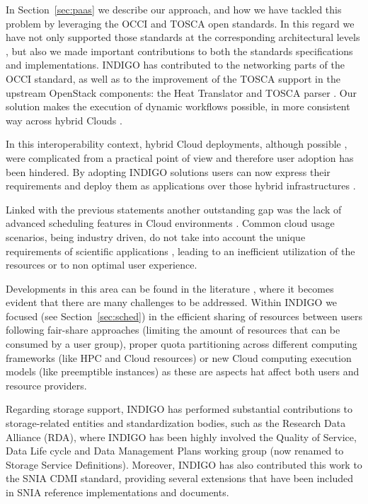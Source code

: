 \documentclass{article}
\begin{document}
In Section~\ref{sec:paas} we describe our approach, and how we have tackled this problem by 
leveraging the OCCI \cite{Nyren2010,Metsch2010,Metsch2011} and TOSCA \cite{TOSCA} open
standards. In this regard we have not only supported those standards at the
corresponding architectural levels \cite{Teckelmann2011,LopezGarcia2016b}, but
also we made important contributions to both the standards specifications and
implementations. INDIGO has contributed to the networking parts of the OCCI
standard, as well as to the improvement of the TOSCA support in the upstream OpenStack
components: the Heat Translator and TOSCA parser \cite{LopezGarcia2017b}. Our solution makes the execution of dynamic workflows \cite{Hardt2012,Fakhfakh2014,Stockton2017} possible, in more consistent way across hybrid Clouds \cite{PLOCIENNIK2016722}.

In this interoperability context, hybrid Cloud deployments, although possible
\cite{moreno2011multicloud,Katsaros,Lorido-Botran2014}, were complicated from a practical 
point of view and therefore user adoption has been hindered. 
By adopting INDIGO solutions users can now express their requirements and deploy them as applications over those hybrid infrastructures \cite{LopezGarcia2017}. 

Linked with the previous statements another outstanding gap was the lack of
advanced scheduling features in Cloud environments
\cite{Singh2016}. Common cloud usage scenarios, being industry driven, do not
take into account the unique requirements of scientific applications
\cite{LopezGarcia2017c}, leading to an inefficient utilization of the resources
or to non optimal user experience. 

Developments in this area can be found in the literature 
\cite{Chauhan2017,Somasundaram2014,Sotomayor2006,Manvi2014}, where it becomes evident that 
there are many challenges to be addressed. Within INDIGO we focused
(see Section~\ref{sec:sched}) in the efficient sharing of resources between users
following fair-share approaches (limiting the amount of resources that can be
consumed by a user group), proper quota partitioning across different computing
frameworks (like HPC and Cloud resources) or new Cloud computing execution
models (like preemptible instances) as these are aspects hat affect both users
and resource providers.

Regarding storage support, INDIGO has performed substantial contributions to
storage-related entities and standardization bodies, such as the Research Data
Alliance (RDA), where INDIGO has been highly involved the Quality of Service,
Data Life cycle and Data Management Plans working group (now renamed to Storage
Service Definitions). Moreover, INDIGO has also contributed this work to the
SNIA CDMI standard, providing several extensions that have been included in
SNIA reference implementations and documents.
\end{document}

